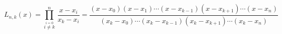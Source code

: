 \documentclass{article} %
\begin{document}
$$ L_{n,k}(x)
= \prod_{\overset{i=0}{i\neq k}}^{n}\,\frac{x-x_i}{x_k-x_i}
= \frac{(x-x_0)(x-x_1)\cdots(x-x_{k-1})(x-x_{k+1})\cdots(x-x_n)}{
	(x_k-x_0)\cdots(x_k-x_{k-1})(x_k-x_{k+1})\cdots(x_k-x_n)
} $$
\end{document}
